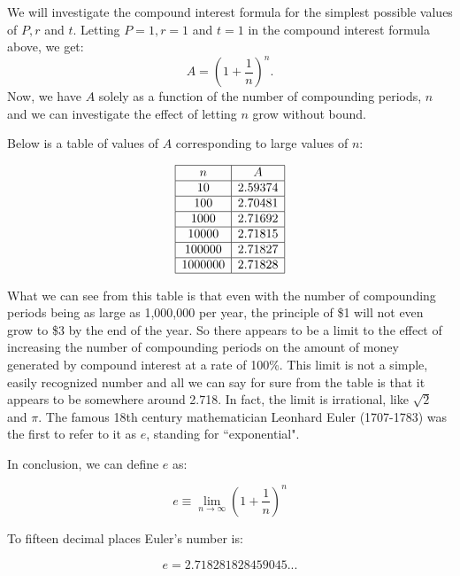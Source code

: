 \documentclass[handout]{ximera}
\begin{document}
\begin{example}[example 8]
We will investigate the compound interest formula for the simplest possible values of $P, r$ and $t$.
Letting $P=1, r= 1$ and $t=1$ in the compound interest formula above, we get:
\[
A = \left(1 + \frac{1}{n}\right)^n.
\]
 Now, we have $A$ solely as a function of the number of compounding periods, $n$ and we can investigate the 
 effect of letting $n$ grow without bound.
 
 

Below is a table of values of $A$ corresponding to large values of $n$:


\[
\begin{array}{| c | c|}
	\hline
  n & A\\
  \hline
  10 & 2.59374 \\
  \hline
  100 & 2.70481 \\ 
	\hline 
	1000 & 2.71692\\
	\hline
	10000 & 2.71815	\\
	\hline
	100000 & 2.71827\\
	\hline
	1000000 & 2.71828\\
	\hline
\end{array}
\]

What we can see from this table is that even with the number of compounding periods being as large as 1,000,000 per year, 
the principle of \$1 will not even grow to \$3 by the end of the year.  So there appears to be a limit to the effect of increasing the 
number of compounding periods on the amount of money generated by compound interest at a rate of 100\%. 
This limit is not a simple, easily recognized number and all we can say for sure from the table is that it appears to be somewhere around 2.718.
In fact, the limit is irrational, like $\sqrt 2$ and $\pi$. The famous 18th century mathematician Leonhard Euler (1707-1783) was the first to 
refer to it as $e$, standing for ``exponential".  

In conclusion, we can define $e$ as:

\[e \equiv \lim_{n \to \infty} \left(1+\frac{1}{n}\right)^n \]


To fifteen decimal places Euler's number is:

\[ e = 2.718281828459045... \]

\end{example}
\end{document}
